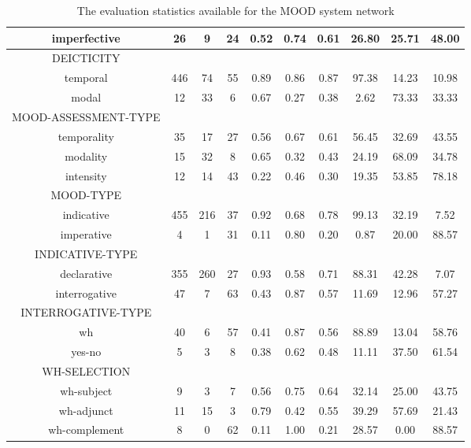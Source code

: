 \begin{table}[!ht]
{\begin{tabular}{|c|c|c|c|c|c|c|c|c|c|}
            imperfective & 26  & 9  & 24  & 0.52 & 0.74 & 0.61 & 26.80 & 25.71 & 48.00 \\ \hline
            DEICTICITY &  &  &  &  &  &  &  &  &  \\ \hline            
            temporal & 446 & 74 & 55 & 0.89 & 0.86 & 0.87 & 97.38 & 14.23 & 10.98 \\ \hline
            modal    & 12  & 33 & 6  & 0.67 & 0.27 & 0.38 & 2.62  & 73.33 & 33.33 \\ \hline
            MOOD-ASSESSMENT-TYPE  &  &  &  &  &  &  &  &  &  \\ \hline            
            temporality & 35 & 17 & 27 & 0.56 & 0.67 & 0.61 & 56.45 & 32.69 & 43.55 \\ \hline
            modality    & 15 & 32 & 8  & 0.65 & 0.32 & 0.43 & 24.19 & 68.09 & 34.78 \\ \hline
            intensity   & 12 & 14 & 43 & 0.22 & 0.46 & 0.30 & 19.35 & 53.85 & 78.18 \\ \hline
            MOOD-TYPE  &  &  &  &  &  &  &  &  &  \\ \hline                        
            indicative    & 455 & 216 & 37 & 0.92 & 0.68 & 0.78 & 99.13 & 32.19 & 7.52  \\ \hline
            imperative    & 4   & 1   & 31 & 0.11 & 0.80 & 0.20 & 0.87  & 20.00 & 88.57 \\ \hline
            INDICATIVE-TYPE  &  &  &  &  &  &  &  &  &  \\ \hline                        
            declarative   & 355 & 260 & 27 & 0.93 & 0.58 & 0.71 & 88.31 & 42.28 & 7.07  \\ \hline
            interrogative & 47  & 7   & 63 & 0.43 & 0.87 & 0.57 & 11.69 & 12.96 & 57.27 \\ \hline
            INTERROGATIVE-TYPE  &  &  &  &  &  &  &  &  &  \\ \hline   
             wh            & 40  & 6   & 57 & 0.41 & 0.87 & 0.56 & 88.89 & 13.04 & 58.76 \\ \hline
            yes-no        & 5   & 3   & 8  & 0.38 & 0.62 & 0.48 & 11.11 & 37.50 & 61.54 \\ \hline                     
            WH-SELECTION  &  &  &  &  &  &  &  &  &  \\ \hline                        
            wh-subject    & 9   & 3   & 7  & 0.56 & 0.75 & 0.64 & 32.14 & 25.00 & 43.75 \\ \hline
            wh-adjunct    & 11  & 15  & 3  & 0.79 & 0.42 & 0.55 & 39.29 & 57.69 & 21.43 \\ \hline
            wh-complement & 8   & 0   & 62 & 0.11 & 1.00 & 0.21 & 28.57 & 0.00  & 88.57 \\ \hline
        \end{tabular}
    }
    \caption{The evaluation statistics available for the MOOD system network}
    \label{tab:features-mood}
\end{table}


